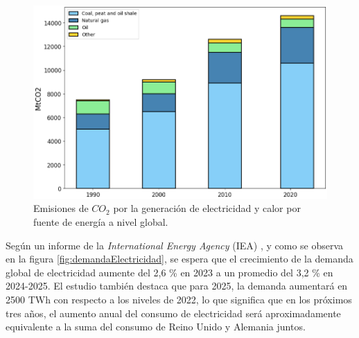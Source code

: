 \newpage

\begin{figure}[ht]
	\centering
	\includegraphics[width=1\textwidth]{./Figures/co2_emissions.png}
	\caption[Emisiones de $CO_2$ por la generación de electricidad.]{Emisiones de $CO_2$ por la generación de electricidad y calor por fuente de energía a nivel global\footnotemark.}
	\label{fig:emisionesco2}
	
\end{figure}


Según un informe de la \textit{International Energy Agency} (IEA) \cite{ieareport}, y como se observa en la figura \ref{fig:demandaElectricidad}, se espera que el crecimiento de la demanda global de electricidad aumente del 2,6 \% en 2023 a un promedio del 3,2 \% en 2024-2025. El estudio también destaca que para 2025, la demanda aumentará en 2500 TWh con respecto a los niveles de 2022, lo que significa que en los próximos tres años, el aumento anual del consumo de electricidad será aproximadamente equivalente a la suma del consumo de Reino Unido y Alemania juntos.

\newpage

